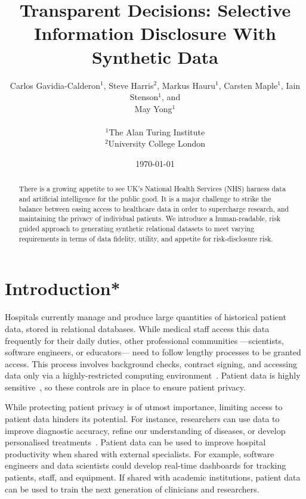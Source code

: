 \documentclass[11pt]{article}
\begin{document}
\title{Transparent Decisions: Selective Information Disclosure With Synthetic Data}
\author{
Carlos Gavidia-Calderon$^1$, Steve Harris$^2$, Markus Hauru$^1$, Carsten Maple$^1$, Iain Stenson$^1$, and \\ May Yong$^1$ \\~\\
$^1$The Alan Turing Institute \\
$^2$University College London
}
\date{\today} %
\maketitle
\begin{abstract}
There is a growing appetite to see UK's National Health Services (NHS) harness data and artificial intelligence for the public good. It is a major challenge to strike the balance between easing access to healthcare data in order to supercharge research, and maintaining the privacy of individual patients. We introduce a human-readable, risk guided approach to generating synthetic relational datasets to meet varying requirements in terms of data fidelity, utility, and appetite for risk-disclosure risk.
\end{abstract}

\section{Introduction*}

Hospitals currently manage and produce large quantities of historical
patient data, stored in relational databases. While medical staff access this data frequently for their daily duties,
other professional communities ---scientists, software engineers, or educators--- need to follow lengthy processes to be granted access.
This process involves background checks, contract signing, and 
accessing data only via a highly-restricted computing environment~\cite{harris2022}.
Patient data is highly sensitive~\cite{schomerus2022}, so these controls are in place to ensure patient privacy.

While protecting patient privacy is of utmost importance, limiting access to 
patient data hinders its potential.
For instance, researchers can use data to improve diagnostic accuracy, refine our understanding of diseases, or develop personalised
treatments~\cite{tucker2020}.
Patient data can be used to improve hospital productivity when shared
with external specialists.
For example, software engineers and data scientists could develop real-time dashboards 
for tracking patients, staff, and equipment.
If shared with academic institutions, patient data can be used to train the next generation of clinicians and researchers.
\end{document}

